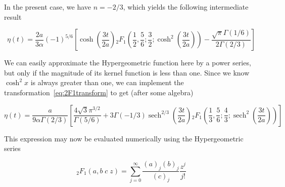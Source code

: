 \documentclass[preprint,notitlepage,amsmath,amssymb,floatfix]{revtex4-1}
\DeclareMathOperator{\sech}{sech}
\begin{document}
\noindent In the present case, we have $n=-2/3$, which yields the following intermediate result

\begin{equation}
\eta\left(t\right) = \frac{2a}{3\alpha}\left(-1\right)^{5/6}\left[\cosh\left(\frac{3t}{2a}\right) {}_2F_1\left(\frac{1}{2},\frac{5}{6};\frac{3}{2};\cosh^2\left(\frac{3t}{2a}\right)\right) - \frac{\sqrt{\pi}\Gamma\left(1/6\right)}{2\Gamma\left(2/3\right)}\right]
\end{equation}

\noindent We can easily approximate the Hypergeometric function here by a power series, but only if the magnitude of its kernel function is less than one.  Since we know $\cosh^2x$ is always greater than one, we can implement the transformation~\eqref{eq:2F1transform} to get (after some algebra)

\begin{equation}
\eta\left(t\right) = \frac{a}{9\alpha\Gamma\left(2/3\right)}\left[\frac{4\sqrt{3}\pi^{3/2}}{\Gamma\left(5/6\right)}+3\Gamma\left(-1/3\right)\sech^{2/3}\left(\frac{3t}{2a}\right) {}_2F_1\left(\frac{1}{3},\frac{5}{6};\frac{4}{3};\sech^2\left(\frac{3t}{2a}\right)\right)\right]
\end{equation}

\noindent This expression may now be evaluated numerically using the Hypergeometric series

\begin{equation}
{}_2F_1\left(a,b\;c\;z\right) = \sum\limits_{j=0}^{\infty} \frac{\left(a\right)_j\left(b\right)_j}{\left(c\right)_j}\frac{z^j}{j!}
\end{equation}



\end{document}
